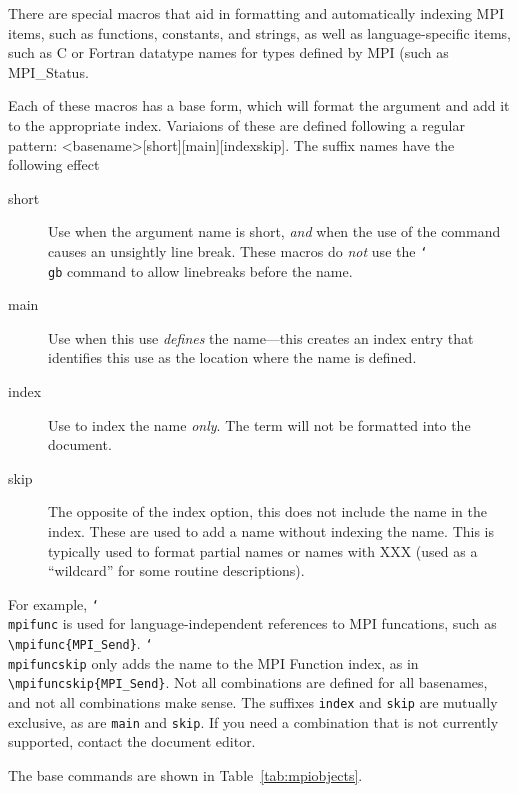 \documentclass[letterpaper,twoside,11pt,fleqn]{article}
\def\cmd#1{\texttt{\char`\\#1}}
\begin{document}
There are special macros that aid in formatting and automatically
indexing MPI items, such as functions, constants, and strings, as well
as language-specific items, such as C or Fortran datatype names for
types defined by MPI (such as \textsf{MPI\_Status}.

Each of these macros has a base form, which will format the argument
and add it to the appropriate index.
Variaions of these are defined following a regular pattern:
\textsf{\textless{}basename\textgreater[short][main][index\textbar{}skip]}.
The suffix names have the following effect
\begin{description}
\item[short]Use when the argument name is short, \emph{and} when the
  use of the command causes an unsightly line break. These macros do
  \emph{not} use the \cmd{gb} command to allow linebreaks before the
  name.
\item[main]Use when this use \emph{defines} the name---this creates an
  index entry that identifies this use as the location where the name
  is defined.
\item[index]Use to index the name \emph{only}. The term will not be
  formatted into the document.
\item[skip]The opposite of the index option, this does not include the
  name in the index. These are used to add a name without indexing the
  name. This is typically used to format partial names or names with
  \textsf{XXX} (used as a ``wildcard'' for some routine descriptions).
\end{description}
For example, \cmd{mpifunc} is used for language-independent references
to MPI funcations, such as
\verb+\mpifunc{MPI_Send}+. \cmd{mpifuncskip} only adds the name to the
MPI Function index, as in \verb+\mpifuncskip{MPI_Send}+.
Not all combinations are defined for all basenames, and not all
combinations make sense.
The suffixes \texttt{index} and \texttt{skip} are mutually exclusive,
as are \texttt{main} and \texttt{skip}.
If you need a combination that is not currently supported, contact the
document editor.

The base commands are shown in Table~\ref{tab:mpiobjects}.
\end{document}
